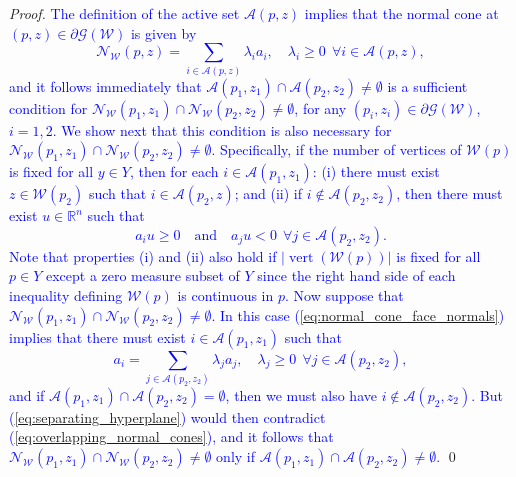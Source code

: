 \documentclass[smallextended]{svjour3}       %
\numberwithin{equation}{section}
\DeclareMathOperator{\vertices}{vert}
\newcommand{\revision}[1]{\textcolor{blue}{#1}}
\begin{document}
\begin{proof}
\revision{
The definition of the active set $\mathcal A(p,z)$ implies that the normal cone at $(p,z)\in \partial \mathscr G (\mathcal W)$ is given by 
\begin{equation}\label{eq:normal_cone_face_normals}
\mathcal N_{\mathcal W}(p,z) = \sum_{i\in\mathcal A(p,z)} \lambda_i a_i, \quad \lambda_i \geq 0 \ \ \forall i\in\mathcal A(p,z) ,
\end{equation}
and it follows immediately that $\mathcal A(p_1,z_1) \cap \mathcal A(p_2,z_2)\neq \emptyset$ is a sufficient condition for $\mathcal N_{\mathcal W}(p_1,z_1) \cap \mathcal N_{\mathcal W}(p_2,z_2) \neq \emptyset$, for any $(p_i,z_i)\in \partial \mathscr G (\mathcal W)$, $i=1,2$. 
%
We show next that this condition is also necessary for $\mathcal N_{\mathcal W}(p_1,z_1) \cap \mathcal N_{\mathcal W}(p_2,z_2) \neq \emptyset$.
%
Specifically, if the number of vertices of $\mathcal W(p)$ is fixed for all $y\in Y$, then for each $i\in\mathcal A(p_1,z_1)$: (i) there must exist $z\in\mathcal W(p_2)$ such that $i\in\mathcal A(p_2,z)$; and (ii) if $i\not\in\mathcal A(p_2,z_2)$, then there must exist $u\in\mathbb R^n$ such that 
\begin{equation}\label{eq:separating_hyperplane}
a_i u \geq 0 \quad \text{and} \quad a_j u < 0 \ \ \forall j\in \mathcal A(p_2,z_2).
\end{equation}
Note that properties (i) and (ii) also hold if $\lvert\vertices(\mathcal W(p))\rvert$ is fixed for all $p\in Y$ except a zero measure subset of $Y$ since the right hand side of each inequality defining $\mathcal W(p)$ is continuous in $p$.
Now suppose that $\mathcal N_{\mathcal W}(p_1,z_1) \cap \mathcal N_{\mathcal W}(p_2,z_2) \neq \emptyset$. In this case (\ref{eq:normal_cone_face_normals}) implies that there must exist $i\in\mathcal A(p_1,z_1)$ such that 
\begin{equation}\label{eq:overlapping_normal_cones}
a_i = \sum_{j\in\mathcal A(p_2,z_2)} \lambda_j a_j, \quad \lambda_j \geq 0 \ \ \forall j\in\mathcal A(p_2,z_2) ,
\end{equation}
and if $\mathcal A(p_1,z_1)\cap\mathcal A(p_2,z_2) = \emptyset$, then we must also have $i\not\in\mathcal A(p_2,z_2)$. But (\ref{eq:separating_hyperplane}) would then contradict (\ref{eq:overlapping_normal_cones}), and it follows that
$\mathcal N_{\mathcal W}(p_1,z_1) \cap \mathcal N_{\mathcal W}(p_2,z_2) \neq \emptyset$ 
only if $\mathcal A(p_1,z_1)\cap\mathcal A(p_2,z_2) \neq \emptyset$.}
\qed
\end{proof}
\end{document}
